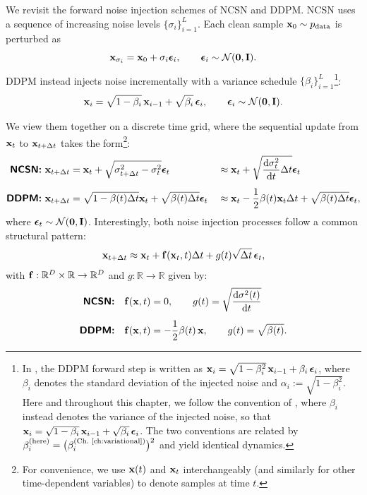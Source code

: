 We revisit the forward noise injection schemes of NCSN and DDPM. NCSN uses a sequence of increasing noise levels $\{\sigma_i\}_{i=1}^L$. 
Each clean sample ${\mathbf{x}}_0 \sim p_{\mathrm{data}}$ is perturbed as
\[
{\mathbf{x}}_{\sigma_i} = {\mathbf{x}}_0 + \sigma_i \bm{\epsilon}_i, 
\qquad \bm{\epsilon}_i \sim \mathcal{N}(\bm{0}, {\mathbf{I}}).
\]
DDPM instead injects noise incrementally with a variance schedule $\{\beta_i\}_{i=1}^L$\footnote{In , the DDPM forward step is written as ${\mathbf{x}}_i = \sqrt{1-\beta_i^2}\,{\mathbf{x}}_{i-1} + \beta_i\,\bm{\epsilon}_i$, where $\beta_i$ denotes the standard deviation of the injected noise and $\alpha_i := \sqrt{1-\beta_i^2}$. Here and throughout this chapter, we follow the convention of \citet{song2020score}, where $\beta_i$ instead denotes the variance of the injected noise, so that ${\mathbf{x}}_i = \sqrt{1-\beta_i}\,{\mathbf{x}}_{i-1} + \sqrt{\beta_i}\,\bm{\epsilon}_i$. The two conventions are related by $\beta_i^{\textup{(here)}} = \bigl(\beta_i^{\textup{(Ch.\ \ref{ch:variational})}}\bigr)^2$ and yield identical dynamics.}:
\[
{\mathbf{x}}_i = \sqrt{1 - \beta_i}\, {\mathbf{x}}_{i-1} + \sqrt{\beta_i}\, \bm{\epsilon}_i, 
\qquad \bm{\epsilon}_i \sim \mathcal{N}(\bm{0}, {\mathbf{I}}).
\]

We view them together on a discrete time grid, where the sequential update from ${\mathbf{x}}_t$ to ${\mathbf{x}}_{t+\Delta t}$ takes the form\footnote{For convenience, we use ${\mathbf{x}}(t)$ and ${\mathbf{x}}_t$ interchangeably (and similarly for other time-dependent variables) to denote samples at time $t$.}:
\begin{align*}
    \text{{\sffamily\textbf{NCSN:}}} \,\,
    & {\mathbf{x}}_{t+\Delta t} = {\mathbf{x}}_t + \sqrt{\sigma_{t+\Delta t}^2 - \sigma_t^2} \bm{\epsilon}_t 
    &&\approx {\mathbf{x}}_t + \sqrt{\frac{\mathop{}\!\mathrm{d} \sigma_t^2}{\mathop{}\!\mathrm{d} t} \Delta t}  \bm{\epsilon}_t \\[0.5em]
    \text{{\sffamily\textbf{DDPM:}}} \,\,
    & {\mathbf{x}}_{t+\Delta t} = \sqrt{1 - \beta(t)\Delta t} {\mathbf{x}}_t + \sqrt{\beta(t)\Delta t} \bm{\epsilon}_t 
    &&\approx {\mathbf{x}}_t - \frac{1}{2} \beta(t) {\mathbf{x}}_t  \Delta t + \sqrt{\beta(t)\Delta t}  \bm{\epsilon}_t,
\end{align*}
where $\bm{\epsilon}_t \sim \mathcal{N}(\bm{0}, {\mathbf{I}})$. Interestingly, both noise injection processes follow a common structural pattern:
\begin{align}\label{eq:euler-discrete-sde}
    {\mathbf{x}}_{t+\Delta t} \approx {\mathbf{x}}_t + {\mathbf{f}}({\mathbf{x}}_t, t) \Delta t + g(t) \sqrt{\Delta t}\, \bm{\epsilon}_t,
\end{align}
with ${\mathbf{f}}: \mathbb{R}^D \times \mathbb{R} \to \mathbb{R}^D$ and $g: \mathbb{R} \to \mathbb{R}$ given by:
\begin{align*}
    \text{{\sffamily\textbf{NCSN:}}} \quad 
    & {\mathbf{f}}({\mathbf{x}}, t) = 0, \qquad g(t) = \sqrt{\frac{\mathop{}\!\mathrm{d} \sigma^2(t)}{\mathop{}\!\mathrm{d} t}} \\[0.5em]
    \text{{\sffamily\textbf{DDPM:}}} \quad 
    & {\mathbf{f}}({\mathbf{x}}, t) = -\frac{1}{2} \beta(t)\, {\mathbf{x}}, \qquad g(t) = \sqrt{\beta(t)}.
\end{align*}


